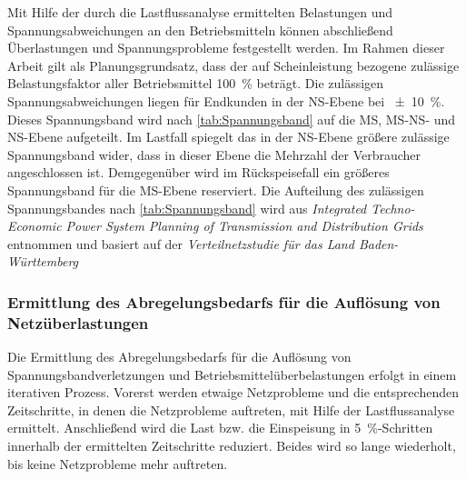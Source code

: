 Mit Hilfe der durch die Lastflussanalyse ermittelten Belastungen und Spannungsabweichungen an den Betriebsmitteln können abschließend Überlastungen und Spannungsprobleme festgestellt werden.
Im Rahmen dieser Arbeit gilt als Planungsgrundsatz, dass der auf Scheinleistung bezogene zulässige Belastungsfaktor aller Betriebsmittel \SI{100}{\percent} beträgt.
Die zulässigen Spannungsabweichungen liegen für Endkunden in der \gls{NS}-Ebene bei \SI{\pm 10}{\percent}.
Dieses Spannungsband wird nach \autoref{tab:Spannungsband} auf die \gls{MS}, \gls{MS}-\gls{NS}- und \gls{NS}-Ebene aufgeteilt.
Im Lastfall spiegelt das in der \gls{NS}-Ebene größere zulässige Spannungsband wider, dass in dieser Ebene die Mehrzahl der Verbraucher angeschlossen ist.
Demgegenüber wird im Rückspeisefall ein größeres Spannungsband für die \gls{MS}-Ebene reserviert.
Die Aufteilung des zulässigen Spannungsbandes nach \autoref{tab:Spannungsband} wird aus \textit{Integrated Techno-Economic Power System Planning of Transmission and Distribution Grids} \cite{Mueller2019a} entnommen und basiert auf der \textit{Verteilnetzstudie für das Land Baden-Württemberg} \cite{Rehtanz2017}




\subsubsection{Ermittlung des Abregelungsbedarfs für die Auflösung von Netzüberlastungen}

Die Ermittlung des Abregelungsbedarfs für die Auflösung von Spannungsbandverletzungen und Betriebsmittelüberbelastungen erfolgt in einem iterativen Prozess.
Vorerst werden etwaige Netzprobleme und die entsprechenden Zeitschritte, in denen die Netzprobleme auftreten, mit Hilfe der Lastflussanalyse ermittelt.
Anschließend wird die Last bzw. die Einspeisung in \SI{5}{\percent}-Schritten innerhalb der ermittelten Zeitschritte reduziert.
Beides wird so lange wiederholt, bis keine Netzprobleme mehr auftreten.\medskip

